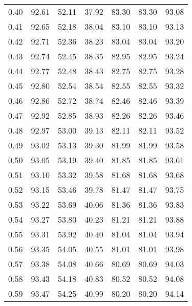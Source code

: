 \begin{tabular}{|c|c|c|c|c|c|c|}
      0.40 &     92.61 &     52.11 &      37.92 &   83.30 &      83.30 &         93.08 \\
      0.41 &     92.65 &     52.18 &      38.04 &   83.10 &      83.10 &         93.13 \\
      0.42 &     92.71 &     52.36 &      38.23 &   83.04 &      83.04 &         93.20 \\
      0.43 &     92.74 &     52.45 &      38.35 &   82.95 &      82.95 &         93.24 \\
      0.44 &     92.77 &     52.48 &      38.43 &   82.75 &      82.75 &         93.28 \\
      0.45 &     92.80 &     52.54 &      38.54 &   82.55 &      82.55 &         93.32 \\
      0.46 &     92.86 &     52.72 &      38.74 &   82.46 &      82.46 &         93.39 \\
      0.47 &     92.92 &     52.85 &      38.93 &   82.26 &      82.26 &         93.46 \\
      0.48 &     92.97 &     53.00 &      39.13 &   82.11 &      82.11 &         93.52 \\
      0.49 &     93.02 &     53.13 &      39.30 &   81.99 &      81.99 &         93.58 \\
      0.50 &     93.05 &     53.19 &      39.40 &   81.85 &      81.85 &         93.61 \\
      0.51 &     93.10 &     53.32 &      39.58 &   81.68 &      81.68 &         93.68 \\
      0.52 &     93.15 &     53.46 &      39.78 &   81.47 &      81.47 &         93.75 \\
      0.53 &     93.22 &     53.69 &      40.06 &   81.36 &      81.36 &         93.83 \\
      0.54 &     93.27 &     53.80 &      40.23 &   81.21 &      81.21 &         93.88 \\
      0.55 &     93.31 &     53.92 &      40.40 &   81.04 &      81.04 &         93.94 \\
      0.56 &     93.35 &     54.05 &      40.55 &   81.01 &      81.01 &         93.98 \\
      0.57 &     93.38 &     54.08 &      40.66 &   80.69 &      80.69 &         94.03 \\
      0.58 &     93.43 &     54.18 &      40.83 &   80.52 &      80.52 &         94.08 \\
      0.59 &     93.47 &     54.25 &      40.99 &   80.20 &      80.20 &         94.14 \\

\end{tabular}
